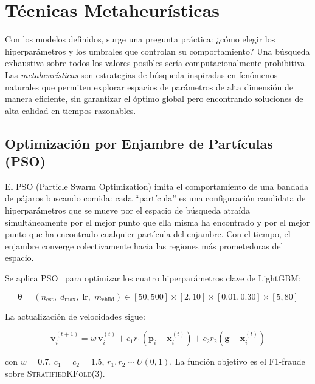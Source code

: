 \documentclass{llncs}
\begin{document}
\section{Técnicas Metaheurísticas}
\label{sec:meta}

Con los modelos definidos, surge una pregunta práctica: ¿cómo
elegir los hiperparámetros y los umbrales que controlan su
comportamiento?
Una búsqueda exhaustiva sobre todos los valores posibles sería
computacionalmente prohibitiva.
Las \emph{metaheurísticas} son estrategias de búsqueda inspiradas
en fenómenos naturales que permiten explorar espacios de parámetros
de alta dimensión de manera eficiente, sin garantizar el óptimo
global pero encontrando soluciones de alta calidad en tiempos
razonables.

\subsection{Optimización por Enjambre de Partículas (PSO)}
\label{sec:meta:pso}

El PSO (Particle Swarm Optimization) imita el comportamiento de
una bandada de pájaros buscando comida: cada ``partícula'' es
una configuración candidata de hiperparámetros que se mueve por
el espacio de búsqueda atraída simultáneamente por el mejor punto
que ella misma ha encontrado y por el mejor punto que ha encontrado
cualquier partícula del enjambre.
Con el tiempo, el enjambre converge colectivamente hacia las
regiones más prometedoras del espacio.

Se aplica PSO~\cite{kennedy1995} para optimizar los
cuatro hiperparámetros clave de LightGBM:

\begin{equation}
  \boldsymbol{\theta} = (n_{\mathrm{est}},\; d_{\max},\;
    \mathrm{lr},\; m_{\mathrm{child}})
  \in [50,500] \times [2,10] \times [0.01,0.30] \times [5,80]
\end{equation}

La actualización de velocidades sigue:

\begin{equation}
  \mathbf{v}_i^{(t+1)} = w\,\mathbf{v}_i^{(t)}
    + c_1 r_1 (\mathbf{p}_i - \mathbf{x}_i^{(t)})
    + c_2 r_2 (\mathbf{g} - \mathbf{x}_i^{(t)})
  \label{eq:pso}
\end{equation}

con $w=0.7$, $c_1=c_2=1.5$, $r_1,r_2 \sim U(0,1)$.
La función objetivo es el F1-fraude sobre \textsc{StratifiedKFold}(3).
\end{document}

